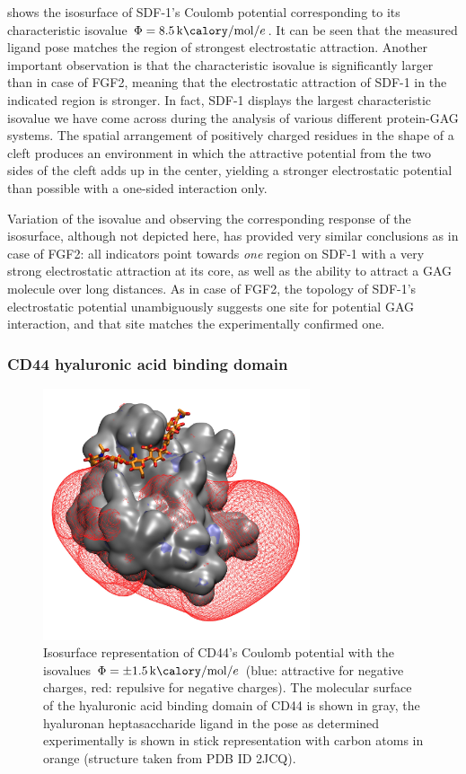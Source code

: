  shows the isosurface of SDF-1's Coulomb potential
corresponding to its characteristic isovalue
$\Phi=\SI{8.5}{\kilo\calory\per\mole\per\elementarycharge}$. It can be seen that
the measured ligand pose matches the region of strongest electrostatic
attraction. Another important observation is that the characteristic isovalue is
significantly larger than in case of FGF2, meaning that the electrostatic
attraction of SDF-1 in the indicated region is stronger. In fact, SDF-1 displays
the largest characteristic isovalue we have come across during the analysis of
various different protein-GAG systems. The spatial arrangement of positively
charged residues in the shape of a cleft produces an environment in which the
attractive potential from the two sides of the cleft adds up in the center,
yielding a stronger electrostatic potential than possible with a one-sided
interaction only.

Variation of the isovalue and observing the corresponding response of the
isosurface, although not depicted here, has provided very similar conclusions as
in case of FGF2: all indicators point towards \textit{one} region on SDF-1 with
a very strong electrostatic attraction at its core, as well as the ability to
attract a GAG molecule over long distances. As in case of FGF2, the topology of
SDF-1's electrostatic potential unambiguously suggests one site for potential
GAG interaction, and that site matches the experimentally confirmed one.


\subsubsection{CD44 hyaluronic acid binding domain}

\begin{figure}
\centering
\includegraphics[width=0.7\textwidth]{gfx/bspred/2JCQ_isopot500_ligand_view1.jpg}
\caption[]{
Isosurface representation of CD44's Coulomb potential with the isovalues
$\Phi=\pm\SI{1.5}{\kilo\calory\per\mole\per\elementarycharge}$ (blue: attractive
for negative charges, red: repulsive for negative charges). The molecular
surface of the hyaluronic acid binding domain of CD44 is shown in gray, the
hyaluronan heptasaccharide ligand in the pose as determined experimentally is
shown in stick representation with carbon atoms in orange (structure taken from
PDB ID 2JCQ).}
\label{fig:bspred:cd44_estatic}
\end{figure}

